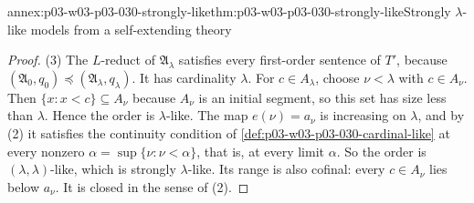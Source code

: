 \begin{annexitem}{annex:p03-w03-p03-030-strongly-like}{thm:p03-w03-p03-030-strongly-like}{Strongly \(\lambda\)-like models from a self-extending theory}
\begin{proof}
(3) The \(L\)-reduct of \(\mathfrak A_\lambda\) satisfies every first-order
sentence of \(T'\), because \((\mathfrak A_0,q_0)\preccurlyeq(\mathfrak
A_\lambda,q_\lambda)\).  It has cardinality \(\lambda\).  For \(c\in
A_\lambda\), choose \(\nu<\lambda\) with \(c\in A_\nu\).  Then
\(\{x:x<c\}\subseteq A_\nu\) because \(A_\nu\) is an initial segment, so this
set has size less than \(\lambda\).  Hence the order is \(\lambda\)-like.
The map \(e(\nu)=a_\nu\) is increasing on \(\lambda\), and by (2) it satisfies
the continuity condition of \cref{def:p03-w03-p03-030-cardinal-like} at
every nonzero \(\alpha=\sup\{\nu:\nu<\alpha\}\), that is, at every limit
\(\alpha\).  So the order is \((\lambda,\lambda)\)-like, which is strongly
\(\lambda\)-like.  Its range is also cofinal: every \(c\in A_\nu\) lies below
\(a_\nu\).  It is closed in the sense of (2).
\end{proof}
\end{annexitem}

